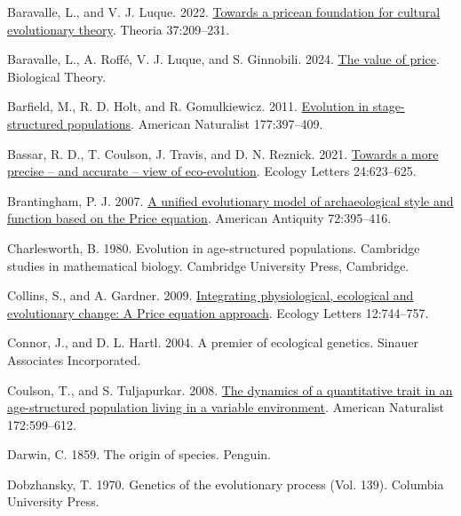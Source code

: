 \documentclass[
]{article}
\newlength{\cslhangindent}
\newenvironment{CSLReferences}[2] %
 {\begin{list}{}{%
  \setlength{\itemindent}{0pt}
  \setlength{\leftmargin}{0pt}
  \setlength{\parsep}{0pt}
  \ifodd #1
   \setlength{\leftmargin}{\cslhangindent}
   \setlength{\itemindent}{-1\cslhangindent}
  \fi
  \setlength{\itemsep}{#2\baselineskip}}}
 {\end{list}}
\begin{document}
\label{refs}
\begin{CSLReferences}{0}{0}
Baravalle, L., and V. J. Luque. 2022.
\href{https://doi.org/10.1387/theoria.21940}{Towards a pricean
foundation for cultural evolutionary theory}. Theoria 37:209--231.

Baravalle, L., A. Roffé, V. J. Luque, and S. Ginnobili. 2024.
\href{https://doi.org/10.1007/s13752-024-00482-4}{The value of price}.
Biological Theory.

Barfield, M., R. D. Holt, and R. Gomulkiewicz. 2011.
\href{https://doi.org/10.1086/658903}{Evolution in stage-structured
populations}. American Naturalist 177:397--409.

Bassar, R. D., T. Coulson, J. Travis, and D. N. Reznick. 2021.
\href{https://doi.org/10.1111/ele.13712}{Towards a more precise -- and
accurate -- view of eco-evolution}. Ecology Letters 24:623--625.

Brantingham, P. J. 2007. \href{https://doi.org/10.2307/40035853}{{A
unified evolutionary model of archaeological style and function based on
the Price equation}}. American Antiquity 72:395--416.

Charlesworth, B. 1980. Evolution in age-structured populations.
Cambridge studies in mathematical biology. Cambridge University Press,
Cambridge.

Collins, S., and A. Gardner. 2009.
\href{https://doi.org/10.1111/j.1461-0248.2009.01340.x}{{Integrating
physiological, ecological and evolutionary change: A Price equation
approach}}. Ecology Letters 12:744--757.

Connor, J., and D. L. Hartl. 2004. {A premier of ecological genetics}.
Sinauer Associates Incorporated.

Coulson, T., and S. Tuljapurkar. 2008.
\href{https://doi.org/10.1086/591693}{The dynamics of a quantitative
trait in an age-structured population living in a variable environment}.
American Naturalist 172:599--612.

Darwin, C. 1859. The origin of species. Penguin.

Dobzhansky, T. 1970. Genetics of the evolutionary process (Vol. 139).
Columbia University Press.


\end{CSLReferences}
\end{document}
